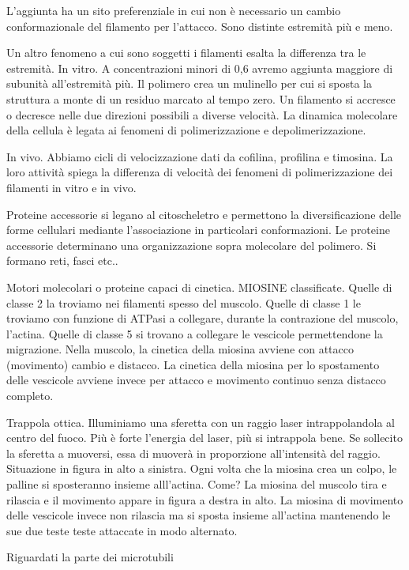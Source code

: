 \documentclass[a4paper,12pt]{article}
\begin{document}
L'aggiunta ha un sito preferenziale in cui non è necessario un cambio conformazionale del filamento per l'attacco. Sono distinte estremità più e meno.

Un altro fenomeno a cui sono soggetti i filamenti esalta la differenza tra le estremità.
In vitro. A concentrazioni minori di 0,6 avremo aggiunta maggiore di subunità all'estremità più. Il polimero crea un mulinello per cui si sposta la struttura a monte di un residuo marcato al tempo zero.
Un filamento si accresce o decresce nelle due direzioni possibili a diverse velocità. La dinamica molecolare della cellula è legata ai fenomeni di polimerizzazione e depolimerizzazione.

In vivo. Abbiamo cicli di velocizzazione dati da cofilina, profilina e timosina. La loro attività spiega la differenza di velocità dei fenomeni di polimerizzazione dei filamenti in vitro e in vivo.


Proteine accessorie si legano al citoscheletro e permettono la diversificazione delle forme cellulari mediante l'associazione in particolari conformazioni. 
Le proteine accessorie determinano una organizzazione sopra molecolare del polimero.
Si formano reti, fasci etc..

Motori molecolari o proteine capaci di cinetica.
MIOSINE classificate. Quelle di classe 2 la troviamo nei filamenti spesso del muscolo.
Quelle di classe 1 le troviamo con funzione di ATPasi a collegare, durante la contrazione del muscolo, l'actina. Quelle di classe 5 si trovano a collegare le vescicole permettendone la migrazione.
Nella muscolo, la cinetica della miosina avviene con attacco (movimento) cambio e distacco. La cinetica della miosina per lo spostamento delle vescicole avviene invece per attacco e movimento continuo senza distacco completo.


 Trappola ottica. Illuminiamo una sferetta con un raggio laser intrappolandola al centro del fuoco. Più è forte l'energia del laser, più si intrappola bene.
 Se sollecito la sferetta a muoversi, essa di muoverà in proporzione all'intensità del raggio. 
 Situazione in figura in alto a sinistra.
 Ogni volta che la miosina crea un colpo, le palline si sposteranno insieme alll'actina. Come? La miosina del muscolo tira e rilascia e il movimento appare in figura a destra in alto. La miosina di movimento delle vescicole invece non rilascia ma si sposta insieme all'actina mantenendo le sue due teste teste attaccate in modo alternato.


Riguardati la parte dei microtubili 
\end{document}
